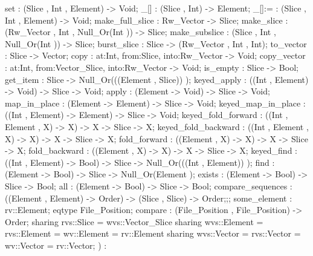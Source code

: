 {{                set : (Slice , Int , Element) -> Void;
                _[] : (Slice , Int) -> Element;
                _[]:= : (Slice , Int , Element) -> Void;
                make_full_slice : Rw_Vector -> Slice;
                make_slice : (Rw_Vector , Int , Null_Or(Int )) -> Slice;
                make_subslice : (Slice , Int , Null_Or(Int )) -> Slice;
                burst_slice : Slice -> (Rw_Vector , Int , Int);
                to_vector : Slice -> Vector;
                copy : {at:Int, from:Slice, into:Rw_Vector} -> Void;
                copy_vector : {at:Int, from:Vector_Slice, into:Rw_Vector} -> Void;
                is_empty : Slice -> Bool;
                get_item : Slice -> Null_Or(((Element , Slice)) );
                keyed_apply : ((Int , Element) -> Void) -> Slice -> Void;
                apply : (Element -> Void) -> Slice -> Void;
                map_in_place : (Element -> Element) -> Slice -> Void;
                keyed_map_in_place : ((Int , Element) -> Element) -> Slice -> Void;
                keyed_fold_forward : ((Int , Element , X) -> X) -> X -> Slice -> X;
                keyed_fold_backward : ((Int , Element , X) -> X) -> X -> Slice -> X;
                fold_forward : ((Element , X) -> X) -> X -> Slice -> X;
                fold_backward : ((Element , X) -> X) -> X -> Slice -> X;
                keyed_find : ((Int , Element) -> Bool) -> Slice -> Null_Or(((Int , Element)) );
                find : (Element -> Bool) -> Slice -> Null_Or(Element );
                exists : (Element -> Bool) -> Slice -> Bool;
                all : (Element -> Bool) -> Slice -> Bool;
                compare_sequences : ((Element , Element) -> Order) -> (Slice , Slice) -> Order;};;
    some_element : rv::Element;
    eqtype File_Position;
    compare : (File_Position , File_Position) -> Order;
    sharing rvs::Slice = wvs::Vector_Slice
    sharing wvs::Element = rvs::Element = wv::Element = rv::Element
    sharing wvs::Vector = rvs::Vector = wv::Vector = rv::Vector};
)
:
